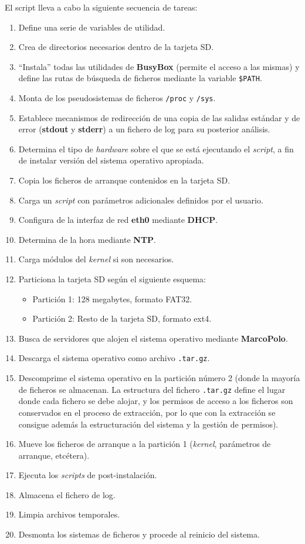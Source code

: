 \documentclass{article}
\begin{document}
El script lleva a cabo la siguiente secuencia de tareas:

\begin{enumerate}
	\item Define una serie de variables de utilidad.
	\item Crea de directorios necesarios dentro de la tarjeta SD.
	\item ``Instala'' todas las utilidades de \textbf{BusyBox} (permite el acceso a las mismas) y define las rutas de búsqueda de ficheros mediante la variable \texttt{\$PATH}.
	\item Monta de los pseudosistemas de ficheros \texttt{/proc} y \texttt{/sys}.
	\item Establece mecanismos de redirección de una copia de las salidas estándar y de error (\textbf{stdout} y \textbf{stderr}) a un fichero de log para su posterior análisis.
	\item Determina el tipo de \textit{hardware} sobre el que se está ejecutando el \textit{script}, a fin de instalar versión del sistema operativo apropiada.
	\item Copia los ficheros de arranque contenidos en la tarjeta SD.
	\item Carga un \textit{script} con parámetros adicionales definidos por el usuario.
	\item Configura de la interfaz de red \textbf{eth0} mediante \textbf{DHCP}.
	\item Determina de la hora mediante \textbf{NTP}.
	\item Carga módulos del \textit{kernel} si son necesarios.
	\item Particiona la tarjeta SD según el siguiente esquema:
	\begin{itemize}
		\item Partición 1: 128 megabytes, formato FAT32.
		\item Partición 2: Resto de la tarjeta SD, formato ext4.
	\end{itemize}
	\item Busca de servidores que alojen el sistema operativo mediante \textbf{MarcoPolo}.
	\item Descarga el sistema operativo como archivo \texttt{.tar.gz}.
	\item Descomprime el sistema operativo en la partición número 2 (donde la mayoría de ficheros se almacenan. La estructura del fichero \texttt{.tar.gz} define el lugar donde cada fichero se debe alojar, y los permisos de acceso a los ficheros son conservados en el proceso de extracción, por lo que con la extracción se consigue además la estructuración del sistema y la gestión de permisos).
	\item Mueve los ficheros de arranque a la partición 1 (\textit{kernel}, parámetros de arranque, etcétera).
	\item Ejecuta los \textit{scripts} de post-instalación.
	\item Almacena el fichero de log.
	\item Limpia archivos temporales.
	\item Desmonta los sistemas de ficheros y procede al reinicio del sistema.
\end{enumerate}
\end{document}
